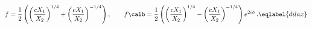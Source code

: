 \begin{equation}
f=\frac 12 \left(\left(\frac{c X_1 }{X_2}\right)^{1/4}+
\left(\frac{c X_1 }{X_2}\right)^{-1/4}\right),\qquad 
f\calb =\frac 12 \left(\left(\frac{c X_1 }{X_2}\right)^{1/4}-
\left(\frac{c X_1 }{X_2}\right)^{-1/4}\right) e^{2i \phi}\,.
\eqlabel{dilax}
\end{equation} 
